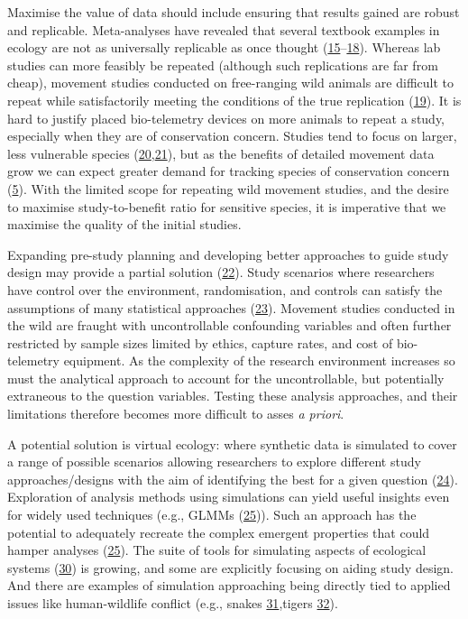 \documentclass[10pt,a4paper]{article}
\begin{document}
Maximise the value of data should include ensuring that results gained are robust and replicable.
Meta-analyses have revealed that several textbook examples in ecology are not as universally replicable as once thought (\protect\hyperlink{ref-clark_ocean_2020}{15}--\protect\hyperlink{ref-wang_irreproducible_2018}{18}).
Whereas lab studies can more feasibly be repeated (although such replications are far from cheap), movement studies conducted on free-ranging wild animals are difficult to repeat while satisfactorily meeting the conditions of the true replication (\protect\hyperlink{ref-fraser_role_2020}{19}).
It is hard to justify placed bio-telemetry devices on more animals to repeat a study, especially when they are of conservation concern.
Studies tend to focus on larger, less vulnerable species (\protect\hyperlink{ref-crane_lots_2021}{20},\protect\hyperlink{ref-tam_quantifying_2021}{21}), but as the benefits of detailed movement data grow we can expect greater demand for tracking species of conservation concern (\protect\hyperlink{ref-Fraser2018}{5}).
With the limited scope for repeating wild movement studies, and the desire to maximise study-to-benefit ratio for sensitive species, it is imperative that we maximise the quality of the initial studies.

Expanding pre-study planning and developing better approaches to guide study design may provide a partial solution (\protect\hyperlink{ref-williams_optimizing_2020}{22}).
Study scenarios where researchers have control over the environment, randomisation, and controls can satisfy the assumptions of many statistical approaches (\protect\hyperlink{ref-christie_simple_2019}{23}).
Movement studies conducted in the wild are fraught with uncontrollable confounding variables and often further restricted by sample sizes limited by ethics, capture rates, and cost of bio-telemetry equipment.
As the complexity of the research environment increases so must the analytical approach to account for the uncontrollable, but potentially extraneous to the question variables.
Testing these analysis approaches, and their limitations therefore becomes more difficult to asses \emph{a priori}.

A potential solution is virtual ecology: where synthetic data is simulated to cover a range of possible scenarios allowing researchers to explore different study approaches/designs with the aim of identifying the best for a given question (\protect\hyperlink{ref-gupta_reserve_2019}{24}).
Exploration of analysis methods using simulations can yield useful insights even for widely used techniques (e.g., GLMMs (\protect\hyperlink{ref-debruine_understanding_2021}{25})).
Such an approach has the potential to adequately recreate the complex emergent properties that could hamper analyses (\protect\hyperlink{ref-debruine_understanding_2021}{25}).
The suite of tools for simulating aspects of ecological systems (\protect\hyperlink{ref-guerracastro_ssp_2021}{30}) is growing, and some are explicitly focusing on aiding study design.
And there are examples of simulation approaching being directly tied to applied issues like human-wildlife conflict (e.g., snakes \protect\hyperlink{ref-goldstein_integrating_2021}{31},tigers \protect\hyperlink{ref-Ahearn2001}{32}).
\end{document}
